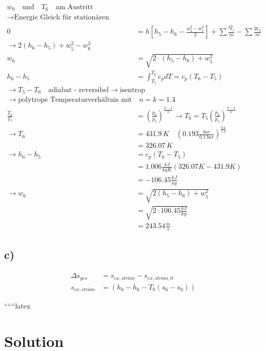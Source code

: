 \begin{align*}
    w_0 \quad \text{und} \quad T_6 \quad \text{am Austritt} \\
    \rightarrow \text{Energie Gleich für stationären Fließprozess} \\
    0 &= h \left[ h_5 - h_6 - \frac{w_2^2 - w_1^2}{2} \right] + \sum \frac{\dot{Q}_j}{\dot{m}} - \sum \frac{\dot{W}_k}{\dot{m}} \\
    \rightarrow 2 (h_6 - h_5) + w_5^2 - w_6^2 \\
    w_6 &= \sqrt{2 \cdot (h_5 - h_6) + w_5^2} \\
    h_6 - h_5 &= \int_{T_5}^{T_6} c_p dT = c_p (T_6 - T_5) \\
    \rightarrow T_5 - T_6 \quad \text{adiabat - reversibel} \rightarrow \text{isentrop} \\
    \rightarrow \text{polytrope Temperaturverhältnis mit} \quad n = k = 1.4 \\
    \frac{T_6}{T_5} &= \left( \frac{p_6}{p_5} \right)^{\frac{n-1}{n}} \rightarrow T_6 = T_5 \left( \frac{p_6}{p_5} \right)^{\frac{n-1}{n}} \\
    \rightarrow T_6 &= 431.9 \, K \quad \left( 0.193 \frac{bar}{0.1 \, bar} \right)^{\frac{0.4}{1.4}} \\
    &= 326.07 \, K \\
    \rightarrow h_6 - h_5 &= c_p (T_6 - T_5) \\
    &= 1.006 \frac{kJ}{kgK} (326.07 K - 431.9 K) \\
    &= -106.45 \frac{kJ}{kg} \\
    \rightarrow w_6 &= \sqrt{2 (h_5 - h_6) + w_5^2} \\
    &= \sqrt{2 \cdot 106.45 \frac{kJ}{kg}} \\
    &= 243.54 \frac{m}{s}
\end{align*}

\subsection*{c)}

\begin{align*}
    \Delta s_{ges} &= s_{ex, ström} - s_{ex, ström, 0} \\
    s_{ex, ström} &= (h_6 - h_6 - T_0 (s_6 - s_0))
\end{align*}

``````latex


\section*{Solution}

